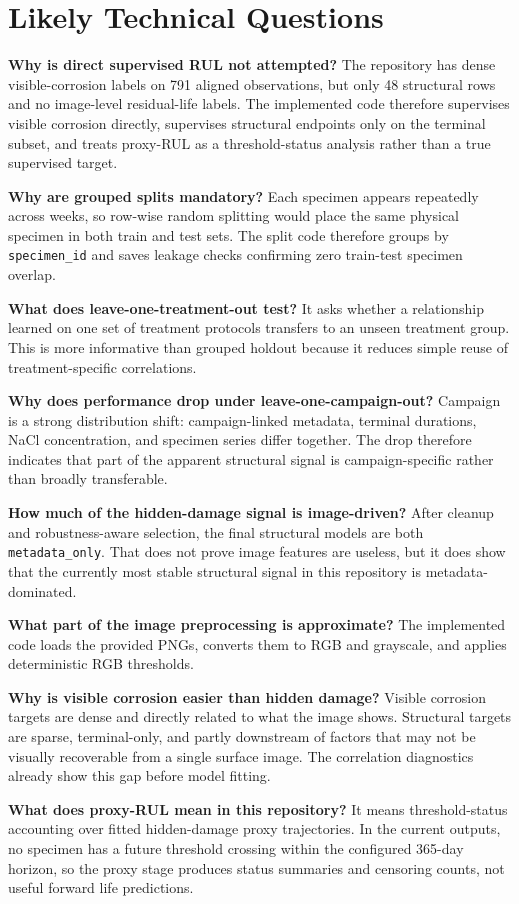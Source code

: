\documentclass[10pt,a4paper,twocolumn]{article}
\begin{document}
\appendix

\section{Likely Technical Questions}

\textbf{Why is direct supervised RUL not attempted?} The repository has dense visible-corrosion labels on 791 aligned observations, but only 48 structural rows and no image-level residual-life labels. The implemented code therefore supervises visible corrosion directly, supervises structural endpoints only on the terminal subset, and treats proxy-RUL as a threshold-status analysis rather than a true supervised target.

\textbf{Why are grouped splits mandatory?} Each specimen appears repeatedly across weeks, so row-wise random splitting would place the same physical specimen in both train and test sets. The split code therefore groups by \texttt{specimen\_id} and saves leakage checks confirming zero train-test specimen overlap.

\textbf{What does leave-one-treatment-out test?} It asks whether a relationship learned on one set of treatment protocols transfers to an unseen treatment group. This is more informative than grouped holdout because it reduces simple reuse of treatment-specific correlations.

\textbf{Why does performance drop under leave-one-campaign-out?} Campaign is a strong distribution shift: campaign-linked metadata, terminal durations, NaCl concentration, and specimen series differ together. The drop therefore indicates that part of the apparent structural signal is campaign-specific rather than broadly transferable.

\textbf{How much of the hidden-damage signal is image-driven?} After cleanup and robustness-aware selection, the final structural models are both \texttt{metadata\_only}. That does not prove image features are useless, but it does show that the currently most stable structural signal in this repository is metadata-dominated.

\textbf{What part of the image preprocessing is approximate?} The implemented code loads the provided PNGs, converts them to RGB and grayscale, and applies deterministic RGB thresholds.

\textbf{Why is visible corrosion easier than hidden damage?} Visible corrosion targets are dense and directly related to what the image shows. Structural targets are sparse, terminal-only, and partly downstream of factors that may not be visually recoverable from a single surface image. The correlation diagnostics already show this gap before model fitting.

\textbf{What does proxy-RUL mean in this repository?} It means threshold-status accounting over fitted hidden-damage proxy trajectories. In the current outputs, no specimen has a future threshold crossing within the configured 365-day horizon, so the proxy stage produces status summaries and censoring counts, not useful forward life predictions.
\end{document}
